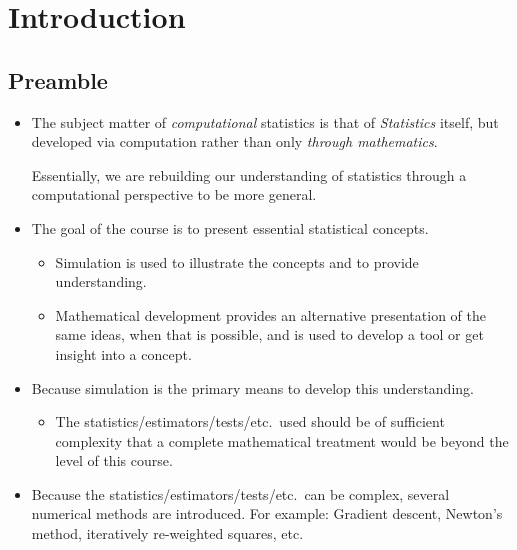 \chapter{Introduction}
\section{Preamble}
\begin{itemize}
    \item The subject matter of \emph{computational} statistics
          is that of \emph{Statistics} itself, but developed via computation
          rather than only \emph{through mathematics}.

          {\color{blue} Essentially, we are rebuilding our understanding of statistics
          through a computational perspective to be more general.}

    \item The goal of the course is to present essential statistical concepts.
          \begin{itemize}
              \item Simulation is used to illustrate the concepts and to provide understanding.
              \item Mathematical development provides an alternative presentation of the same
                    ideas, when that is possible, and is used to develop a tool or get insight into
                    a concept.
          \end{itemize}
    \item Because simulation is the primary means to develop this understanding.
          \begin{itemize}
              \item The statistics/estimators/tests/etc.\ used should be
                    of sufficient complexity that a complete mathematical treatment would be
                    beyond the level of this course.
          \end{itemize}
    \item Because the statistics/estimators/tests/etc.\ can be complex, several
          numerical methods are introduced. For example:
          Gradient descent, Newton's method, iteratively re-weighted squares, etc.
\end{itemize}
